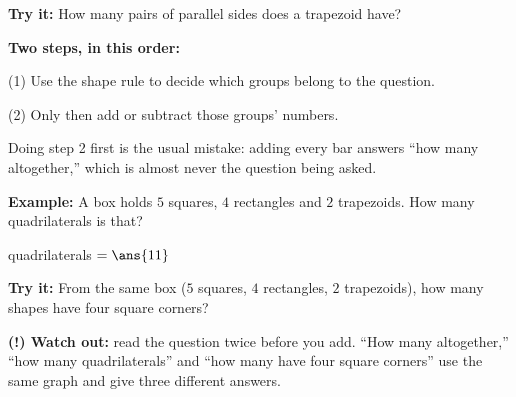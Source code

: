 \documentclass[12pt]{article}
\begin{document}
\begin{tryitbox}
\textbf{Try it:} \quad How many pairs of parallel sides does a trapezoid have?\\[2pt]
\end{tryitbox}


\begin{formulabox}
\textbf{Two steps, in this order:}\par
(1) Use the shape rule to decide which groups belong to the question.\par
(2) Only then add or subtract those groups' numbers.\par
Doing step 2 first is the usual mistake: adding every bar answers ``how many altogether,'' which is
almost never the question being asked.
\end{formulabox}

\begin{examplebox}
\textbf{Example:} \quad A box holds $5$ squares, $4$ rectangles and $2$ trapezoids. How many
quadrilaterals is that?

quadrilaterals $= \ans{11}$
\end{examplebox}

\begin{tryitbox}
\textbf{Try it:} \quad From the same box ($5$ squares, $4$ rectangles, $2$ trapezoids), how many
shapes have four square corners?\\[2pt]
\end{tryitbox}

\begin{watchoutbox}
\textbf{(!) Watch out:} read the question twice before you add. ``How many altogether,'' ``how many
quadrilaterals'' and ``how many have four square corners'' use the same graph and give three
different answers.
\end{watchoutbox}
\end{document}
